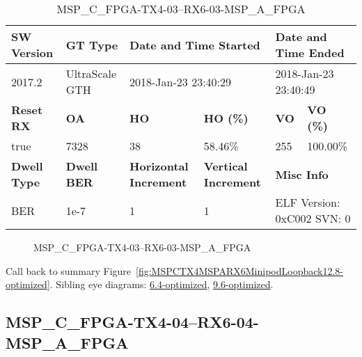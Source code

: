 \begin{table}[h]
\centering
\caption{MSP\_C\_FPGA-TX4-03--RX6-03-MSP\_A\_FPGA}
\label{tab:MSPCFPGATX403RX603MSPAFPGA12.8-optimized}
\begin{tabular}{@{}|l|l|l|l|l|l|@{}}
\toprule
\textbf{SW Version}                & \textbf{GT Type}   & \multicolumn{2}{l|}{\textbf{Date and Time Started}}            & \multicolumn{2}{l|}{\textbf{Date and Time Ended}}        \\ \midrule
2017.2                       & UltraScale GTH          & \multicolumn{2}{l|}{2018-Jan-23 23:40:29}                   & \multicolumn{2}{l|}{2018-Jan-23 23:40:49}               \\ \midrule
\textbf{Reset RX}                  & \textbf{OA} & \textbf{HO}   & \textbf{HO (\%)} & \textbf{VO} & \textbf{VO (\%)} \\ \midrule
true & 7328        & 38          & 58.46\%        & 255        & 100.00\%       \\ \midrule
\textbf{Dwell Type}                & \textbf{Dwell BER} & \textbf{Horizontal Increment} & \textbf{Vertical Increment}    & \multicolumn{2}{l|}{\textbf{Misc Info}}                  \\ \midrule
BER                            & 1e-7        & 1        & 1           & \multicolumn{2}{l|}{ELF Version: 0xC002 SVN: 0}                         \\ \bottomrule
\end{tabular}
\end{table}

\begin{figure}[h]
\caption{MSP\_C\_FPGA-TX4-03--RX6-03-MSP\_A\_FPGA} \label{fig:MSPCFPGATX403RX603MSPAFPGA12.8-optimized}
\end{figure}

Call back to summary Figure~\ref{fig:MSPCTX4MSPARX6MinipodLoopback12.8-optimized}.
Sibling eye diagrams: \hyperref[sec:MSPCFPGATX403RX603MSPAFPGA6.4-optimized]{6.4-optimized}, \hyperref[sec:MSPCFPGATX403RX603MSPAFPGA9.6-optimized]{9.6-optimized}.

\clearpage
\newpage


\subsection{MSP\_C\_FPGA-TX4-04--RX6-04-MSP\_A\_FPGA}\label{sec:MSPCFPGATX404RX604MSPAFPGA12.8-optimized}

